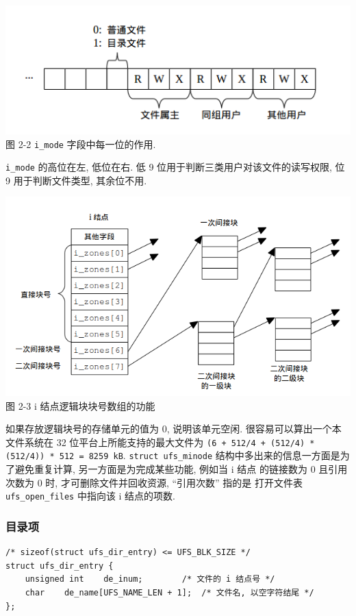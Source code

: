\documentclass[nofonts]{ctexart}
\begin{document}
\includegraphics[width=15cm]{./images/./imode.png}\\图 2-2 \texttt{i\_mode}
字段中每一位的作用.

\texttt{i\_mode} 的高位在左, 低位在右. 低 9
位用于判断三类用户对该文件的读写权限, 位 9 用于判断文件类型, 其余位不用.

\includegraphics[width=15cm]{./images/./i_zones_array.png}\\图 2-3 i
结点逻辑块块号数组的功能

如果存放逻辑块号的存储单元的值为 0, 说明该单元空闲.
很容易可以算出一个本文件系统在 32 位平台上所能支持的最大文件为
\texttt{(6 + 512/4 + (512/4) * (512/4)) * 512 = 8259 kB}.
\texttt{struct ufs\_minode} 结构中多出来的信息一方面是为了避免重复计算,
另一方面是为完成某些功能, 例如当 i 结点 的链接数为 0 且引用次数为 0 时,
才可删除文件并回收资源, ``引用次数'' 指的是 打开文件表
\texttt{ufs\_open\_files} 中指向该 i 结点的项数.

\subsubsection{目录项}\label{ux76eeux5f55ux9879}

\begin{verbatim}
/* sizeof(struct ufs_dir_entry) <= UFS_BLK_SIZE */
struct ufs_dir_entry {
    unsigned int    de_inum;        /* 文件的 i 结点号 */
    char    de_name[UFS_NAME_LEN + 1];  /* 文件名, 以空字符结尾 */
};
\end{verbatim}
\end{document}
